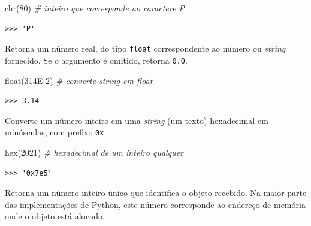 \documentclass[
]{book}
\newenvironment{Shaded}{\begin{snugshade}}{\end{snugshade}}
\newcommand{\BuiltInTok}[1]{#1}
\newcommand{\CommentTok}[1]{\textcolor[rgb]{0.56,0.35,0.01}{\textit{#1}}}
\newcommand{\DecValTok}[1]{\textcolor[rgb]{0.00,0.00,0.81}{#1}}
\newcommand{\NormalTok}[1]{#1}
\newcommand{\StringTok}[1]{\textcolor[rgb]{0.31,0.60,0.02}{#1}}
\providecommand{\tightlist}{%
  \setlength{\itemsep}{0pt}\setlength{\parskip}{0pt}}
\begin{document}
\begin{Shaded}
\begin{Highlighting}[]
\BuiltInTok{chr}\NormalTok{(}\DecValTok{80}\NormalTok{) }\CommentTok{\# inteiro que corresponde ao caractere \textquotesingle{}P\textquotesingle{}}
\end{Highlighting}
\end{Shaded}

\begin{verbatim}
>>> 'P'
\end{verbatim}

\begin{description}
\tightlist
\item[\texttt{float(x)}]
Retorna um número real, do tipo \texttt{float} correspondente ao número ou \emph{string} fornecido. Se o argumento é omitido, retorna \texttt{0.0}.
\end{description}

\begin{Shaded}
\begin{Highlighting}[]
\BuiltInTok{float}\NormalTok{(}\StringTok{\textquotesingle{}314E{-}2\textquotesingle{}}\NormalTok{) }\CommentTok{\# converte string em float}
\end{Highlighting}
\end{Shaded}

\begin{verbatim}
>>> 3.14
\end{verbatim}

\begin{description}
\tightlist
\item[\texttt{hex(x)}]
Converte um número inteiro em uma \emph{string} (um texto) hexadecimal em minúsculas, com prefixo \texttt{0x}.
\end{description}

\begin{Shaded}
\begin{Highlighting}[]
\BuiltInTok{hex}\NormalTok{(}\DecValTok{2021}\NormalTok{) }\CommentTok{\# hexadecimal de um inteiro qualquer}
\end{Highlighting}
\end{Shaded}

\begin{verbatim}
>>> '0x7e5'
\end{verbatim}

\begin{description}
\tightlist
\item[\texttt{id(objeto)}]
Retorna um número inteiro único que identifica o objeto recebido. Na maior parte das implementações de Python, este número corresponde ao endereço de memória onde o objeto está alocado.
\end{description}
\end{document}
